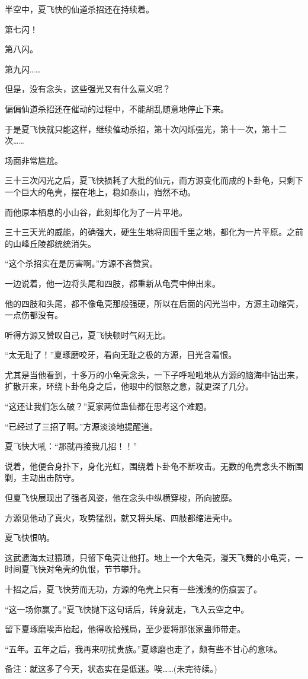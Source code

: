 \begin{this_body}
半空中，夏飞快的仙道杀招还在持续着。

第七闪！

第八闪。

第九闪……

但是，没有念头，这些强光又有什么意义呢？

偏偏仙道杀招还在催动的过程中，不能胡乱随意地停止下来。

于是夏飞快就只能这样，继续催动杀招，第十次闪烁强光，第十一次，第十二次……

场面非常尴尬。

三十三次闪光之后，夏飞快损耗了大批的仙元，而方源变化而成的卜卦龟，只剩下一个巨大的龟壳，摆在地上，稳如泰山，岿然不动。

而他原本栖息的小山谷，此刻却化为了一片平地。

三十三天光的威能，的确强大，硬生生地将周围千里之地，都化为一片平原。之前的山峰丘陵都统统消失。

“这个杀招实在是厉害啊。”方源不吝赞赏。

一边说着，他一边将头尾和四肢，都重新从龟壳中伸出来。

他的四肢和头尾，都不像龟壳那般强硬，所以在后面的闪光当中，方源主动缩壳，一点伤都没有。

听得方源又赞叹自己，夏飞快顿时气闷无比。

“太无耻了！”夏琢磨咬牙，看向无耻之极的方源，目光含着恨。

尤其是当他看到，十多万的小龟壳念头，一下子呼啦啦地从方源的脑海中钻出来，扩散开来，环绕卜卦龟身之后，他眼中的恨怒之意，就更深了几分。

“这还让我们怎么破？”夏家两位蛊仙都在思考这个难题。

“已经过了三招了啊。”方源淡淡地提醒道。

夏飞快大吼：“那就再接我几招！！”

说着，他便合身扑下，身化光虹，围绕着卜卦龟不断攻击。无数的龟壳念头不断围剿，主动出击防守。

但夏飞快展现出了强者风姿，他在念头中纵横穿梭，所向披靡。

方源见他动了真火，攻势猛烈，就又将头尾、四肢都缩进壳中。

夏飞快恨呐。

这武遗海太过猥琐，只留下龟壳让他打。地上一个大龟壳，漫天飞舞的小龟壳，一时间夏飞快对龟壳的仇恨，节节攀升。

十招之后，夏飞快劳而无功，方源的龟壳上只有一些浅浅的伤痕罢了。

“这一场你赢了。”夏飞快抛下这句话后，转身就走，飞入云空之中。

留下夏琢磨唉声抬起，他得收拾残局，至少要将那张家蛊师带走。

“五年。五年之后，我再来叨扰贵族。”夏琢磨也走了，颇有些不甘心的意味。

备注：就这多了今天，状态实在是低迷。唉……(未完待续。)

\end{this_body}

